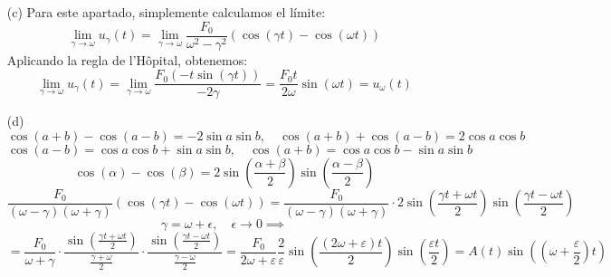 {\begin{enumerate}
\[        \]
        Ahora imponemos las condiciones iniciales:
        \[
            u(t) = \left(x_1 + \frac{F_0}{4 \omega^2}\right) \cos(\omega t) + x_2 \sin(\omega t) + \frac{F_0}{2\omega} t \sin(\omega t)
        \]
        \[
            0 = u(0) = x_1 + \frac{F_0}{4 \omega^2} \implies x_1 = -\frac{F_0}{4 \omega^2}
        \]
        \[
            u'(t) = -\omega \left(x_1 + \frac{F_0}{4 \omega^2}\right) \sin(\omega t) + x_2 \omega \cos(\omega t) + \frac{F_0}{2\omega} \sin(\omega t) + \frac{F_0}{2} t \cos(\omega t)
        \]
        \[
            0 = u'(0) = x_2 \omega \implies x_2 = 0      
        \]

        Por lo tanto, la solución particular es:
        \[
            u_\omega(t) = \frac{F_0}{2\omega} t \sin(\omega t)
        \]
    
        \item [(c)] Para este apartado, simplemente calculamos el límite:
        \[
            \lim_{\gamma \to \omega} u_\gamma(t) = \lim_{\gamma \to \omega} \frac{F_0}{\omega^2 - \gamma^2} (\cos(\gamma t) - \cos(\omega t))
        \]
        Aplicando la regla de l'Hôpital, obtenemos:
        \[
            \lim_{\gamma \to \omega} u_\gamma(t) = \lim_{\gamma \to \omega} \frac{F_0 (-t \sin(\gamma t))}{-2\gamma} = \frac{F_0 t}{2\omega} \sin(\omega t) = u_\omega(t)
        \]
        
        \item [(d)]
        \[
            \cos(a+b) - \cos(a-b) = -2 \sin a \sin b, \quad \cos(a+b) + \cos(a-b) = 2 \cos a \cos b
        \]
        \[
            \cos(a-b) = \cos a \cos b + \sin a \sin b, \quad \cos(a+b) = \cos a \cos b - \sin a \sin b
        \]
        \[
            \cos(\alpha) - \cos(\beta) = 2 \sin\left(\frac{\alpha + \beta}{2}\right) \sin\left(\frac{\alpha - \beta}{2}\right)
        \]
        \[
            \frac{F_0}{(\omega-\gamma)(\omega+\gamma)} (\cos(\gamma t) - \cos(\omega t)) =
            \frac{F_0}{(\omega-\gamma)(\omega+\gamma)} \cdot 2 \sin\left(\frac{\gamma t + \omega t}{2}\right) \sin\left(\frac{\gamma t - \omega t}{2}\right) 
        \]
        \[
            \gamma = \omega + \epsilon, \quad \epsilon \to 0 \implies
        \]
        \[
            = \frac{F_0}{\omega+\gamma} \cdot \frac{\sin\left(\frac{\gamma t + \omega t}{2}\right)}{\frac{\gamma + \omega}{2}} \cdot \frac{\sin\left(\frac{\gamma t - \omega t}{2}\right)}{\frac{\gamma - \omega}{2}} = \frac{F_0}{2\omega+\varepsilon} \frac{2}{\varepsilon} \sin\left(\frac{(2\omega + \varepsilon) t}{2}\right) \sin\left(\frac{\varepsilon t}{2}\right) = A(t) \sin\left((\omega + \frac{\varepsilon}{2}) t\right)
        \]
    \end{enumerate}
}


